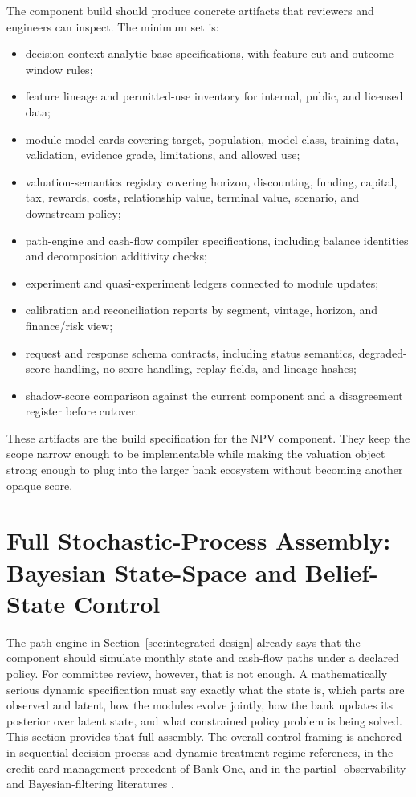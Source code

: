 \documentclass[11pt]{article}
\newcommand{\1}{\mathbf{1}}
\begin{document}
The component build should produce concrete artifacts that reviewers and
engineers can inspect. The minimum set is:
\begin{itemize}[leftmargin=*]
  \item decision-context analytic-base specifications, with feature-cut and
        outcome-window rules;
  \item feature lineage and permitted-use inventory for internal, public, and
        licensed data;
  \item module model cards covering target, population, model class, training
        data, validation, evidence grade, limitations, and allowed use;
  \item valuation-semantics registry covering horizon, discounting, funding,
        capital, tax, rewards, costs, relationship value, terminal value,
        scenario, and downstream policy;
  \item path-engine and cash-flow compiler specifications, including balance
        identities and decomposition additivity checks;
  \item experiment and quasi-experiment ledgers connected to module updates;
  \item calibration and reconciliation reports by segment, vintage, horizon,
        and finance/risk view;
  \item request and response schema contracts, including status semantics,
        degraded-score handling, no-score handling, replay fields, and lineage
        hashes;
  \item shadow-score comparison against the current component and a
        disagreement register before cutover.
\end{itemize}

These artifacts are the build specification for the NPV component. They keep
the scope narrow enough to be implementable while making the valuation object
strong enough to plug into the larger bank ecosystem without becoming another
opaque score.

\section{Full Stochastic-Process Assembly: Bayesian State-Space and Belief-State Control}
\label{sec:state-space-assembly}

The path engine in Section~\ref{sec:integrated-design} already says that the
component should simulate monthly state and cash-flow paths under a declared
policy. For committee review, however, that is not enough. A mathematically
serious dynamic specification must say exactly what the state is, which parts are
observed and latent, how the modules evolve jointly, how the bank updates its
posterior over latent state, and what constrained policy problem is being
solved. This section provides that full assembly. The overall control framing is
anchored in sequential decision-process and dynamic treatment-regime references,
in the credit-card management precedent of Bank One, and in the partial-
observability and Bayesian-filtering literatures
\citep{puterman1994mdp,murphy2003dynamic,trench2003bankone,
smallwood1973pomdp,kaelbling1998pomdp,durbinkoopman2012ssm,
westharrison1997bfdm,doucet2001smc}.
\end{document}
